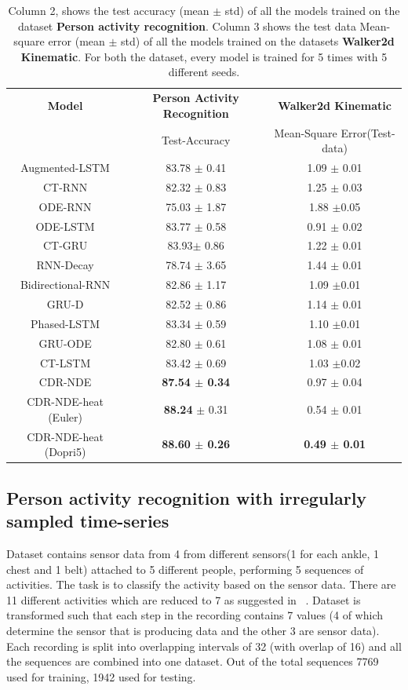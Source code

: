 \documentclass{article} %
\begin{document}
\begin{table}
    \centering
 \caption{Column 2, shows the test accuracy (mean $\pm$
std) of all the models trained on the dataset \textbf{ Person
activity recognition}. Column 3 shows the test data Mean-square error (mean $\pm$
std) of all the models trained on the datasets \textbf{Walker2d Kinematic}. For both the dataset, every model is trained for 5 times with 5 different seeds. }
\begin{tabular}{|c|c|c|}
 \hline
 \textbf{Model} & \textbf{Person Activity Recognition} & \textbf{Walker2d Kinematic} \\ 
 & Test-Accuracy & Mean-Square Error(Test-data) \\
 \hline
 Augmented-LSTM & 83.78 $\pm$ 0.41 & 1.09 $\pm$ 0.01 \\
 CT-RNN & 82.32 $\pm$ 0.83 & 1.25 $\pm$ 0.03\\
 ODE-RNN & 75.03 $\pm$ 1.87 & 1.88 $\pm$0.05\\
 ODE-LSTM & 83.77 $\pm$	0.58 & 0.91 $\pm$ 0.02\\
 CT-GRU & 83.93$\pm$ 0.86 & 1.22 $\pm$ 0.01\\
 RNN-Decay & 78.74	$\pm$ 3.65 & 1.44 $\pm$ 0.01\\
 Bidirectional-RNN & 82.86 $\pm$	1.17 & 1.09 $\pm$0.01 \\
 GRU-D & 82.52	$\pm$ 0.86 & 1.14 $\pm$ 0.01\\
 Phased-LSTM & 83.34 $\pm$	0.59 & 1.10 $\pm$0.01\\
 GRU-ODE & 82.80	$\pm$ 0.61 & 1.08 $\pm$ 0.01\\
 CT-LSTM & 83.42 $\pm$	0.69 & 1.03 $\pm$0.02\\
 \hline 
  CDR-NDE & \textbf{87.54 $\pm$ 0.34} & 0.97 $\pm$ 0.04 \\
 CDR-NDE-heat (Euler) & \textbf{88.24} $\pm$ 0.31 & 0.54 $\pm$ 0.01\\
CDR-NDE-heat (Dopri5) & \textbf{88.60 $\pm$ 0.26} & \textbf{0.49 $\pm$ 0.01}\\
 \hline
\end{tabular}
    \label{tab:results}
\end{table}
\subsection{ Person activity recognition with irregularly sampled time-series}
Dataset contains sensor data from 4 from different sensors(1 for each ankle, 1 chest and 1 belt) attached to 5 different people, performing 5 sequences of activities. The task is to classify the activity based on the sensor data.
There are 11 different activities which are reduced to 7 as suggested in ~\citep{rubanova2019latent}. Dataset is transformed such that each step in the recording contains 7 values (4 of which determine the sensor that is producing data and the other 3 are sensor data). Each recording is split into overlapping intervals of 32 (with overlap of 16) and all the sequences are combined into one dataset. Out of the total sequences 7769 used for training, 1942 used for testing. 
\end{document}
